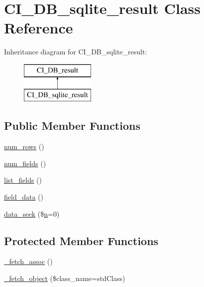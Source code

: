 \hypertarget{class_c_i___d_b__sqlite__result}{}\section{C\+I\+\_\+\+D\+B\+\_\+sqlite\+\_\+result Class Reference}
\label{class_c_i___d_b__sqlite__result}
Inheritance diagram for C\+I\+\_\+\+D\+B\+\_\+sqlite\+\_\+result\+:\begin{figure}[H]
\begin{center}
\leavevmode
\includegraphics[height=2.000000cm]{class_c_i___d_b__sqlite__result}
\end{center}
\end{figure}
\subsection*{Public Member Functions}
\begin{DoxyCompactItemize}
\item 
\mbox{\hyperlink{class_c_i___d_b__sqlite__result_a218657c303ee499b97710ab0cd2f5d6e}{num\+\_\+rows}} ()
\item 
\mbox{\hyperlink{class_c_i___d_b__sqlite__result_af831bf363e4d7d661a717a4932af449d}{num\+\_\+fields}} ()
\item 
\mbox{\hyperlink{class_c_i___d_b__sqlite__result_a50b54eb4ea7cfd039740f532988ea776}{list\+\_\+fields}} ()
\item 
\mbox{\hyperlink{class_c_i___d_b__sqlite__result_a84bffd65e53902ade1591716749a33e3}{field\+\_\+data}} ()
\item 
\mbox{\hyperlink{class_c_i___d_b__sqlite__result_a8255ae91816e4206e29eb7581c5af0f1}{data\+\_\+seek}} (\$\mbox{\hyperlink{cli_2error__php_8php_a2e6b16bbc42094e4c51ade3c10afdcf1}{n}}=0)
\end{DoxyCompactItemize}
\subsection*{Protected Member Functions}
\begin{DoxyCompactItemize}
\item 
\mbox{\hyperlink{class_c_i___d_b__sqlite__result_a43a9a92817f1334a1c10752ec44275a0}{\+\_\+fetch\+\_\+assoc}} ()
\item 
\mbox{\hyperlink{class_c_i___d_b__sqlite__result_a60806be6a9c2488820813c2a7f4fef71}{\+\_\+fetch\+\_\+object}} (\$class\+\_\+name=\textquotesingle{}std\+Class\textquotesingle{})
\end{DoxyCompactItemize}
